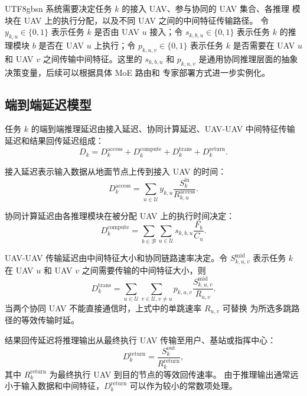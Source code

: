 \documentclass[conference]{IEEEtran}
\begin{document}
\begin{CJK*}{UTF8}{gbsn}
系统需要决定任务 $k$ 的接入 UAV、参与协同的 UAV 集合、各推理
模块在 UAV 上的执行分配，以及不同 UAV 之间的中间特征传输路径。
令 $y_{k,u}\in\{0,1\}$ 表示任务 $k$ 是否由 UAV $u$ 接入；令
$s_{k,b,u}\in\{0,1\}$ 表示任务 $k$ 的推理模块 $b$ 是否在 UAV $u$
上执行；令 $p_{k,u,v}\in\{0,1\}$ 表示任务 $k$ 是否需要在 UAV $u$
和 UAV $v$ 之间传输中间特征。这里的 $s_{k,b,u}$ 和 $p_{k,u,v}$
是通用协同推理层面的抽象决策变量，后续可以根据具体 MoE 路由和
专家部署方式进一步实例化。

\subsection{端到端延迟模型}

任务 $k$ 的端到端推理延迟由接入延迟、协同计算延迟、UAV-UAV
中间特征传输延迟和结果回传延迟组成：
\begin{equation}
D_k = D_k^{\mathrm{access}} + D_k^{\mathrm{compute}}
    + D_k^{\mathrm{trans}} + D_k^{\mathrm{return}} .
\end{equation}

接入延迟表示输入数据从地面节点上传到接入 UAV 的时间：
\begin{equation}
D_k^{\mathrm{access}}
= \sum_{u\in\mathcal{U}} y_{k,u}
  \frac{S_k^{\mathrm{in}}}{R_{k,u}^{\mathrm{access}}} .
\end{equation}

协同计算延迟由各推理模块在被分配 UAV 上的执行时间决定：
\begin{equation}
D_k^{\mathrm{compute}}
= \sum_{b\in\mathcal{B}}\sum_{u\in\mathcal{U}}
   s_{k,b,u}\frac{F_b}{C_u}.
\end{equation}

UAV-UAV 传输延迟由中间特征大小和协同链路速率决定。令
$S_{k,u,v}^{\mathrm{mid}}$ 表示任务 $k$ 在 UAV $u$ 和 UAV $v$
之间需要传输的中间特征大小，则
\begin{equation}
D_k^{\mathrm{trans}}
= \sum_{u\in\mathcal{U}}\sum_{v\in\mathcal{U},v\ne u}
   p_{k,u,v}\frac{S_{k,u,v}^{\mathrm{mid}}}{R_{u,v}} .
\end{equation}
当两个协同 UAV 不能直接通信时，上式中的单跳速率 $R_{u,v}$ 可替换
为所选多跳路径的等效传输时延。

结果回传延迟将推理输出从最终执行 UAV 传输至用户、基站或指挥中心：
\begin{equation}
D_k^{\mathrm{return}}
= \frac{S_k^{\mathrm{out}}}{R_k^{\mathrm{return}}},
\end{equation}
其中 $R_k^{\mathrm{return}}$ 为最终执行 UAV 到目的节点的等效回传速率。
由于推理输出通常远小于输入数据和中间特征，$D_k^{\mathrm{return}}$
可以作为较小的常数项处理。


\end{CJK*}
\end{document}
